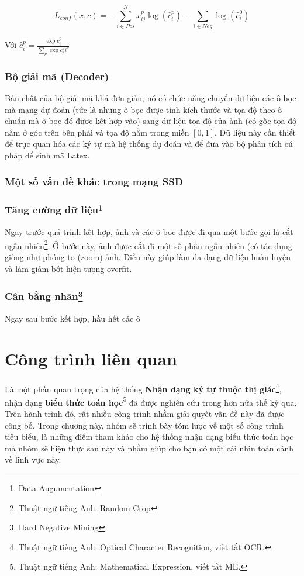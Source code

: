 \documentclass[a4paper,12pt]{article}
\begin{document}
	$$L_{conf}(x, c) = - \sum^N_{i \in Pos} x^p_{ij} \log (\hat{c}^p_i) - \sum_{i \in Neg} \log (\hat{c}^0_i) $$
	
	Với $\hat{c}_i^p = \frac{\exp{c_i^p}}{\sum_p \exp{c)i^p}}$
	
	\subsubsection{Bộ giải mã (Decoder)}
	
	Bản chất của bộ giải mã khá đơn giản, nó có chức năng chuyển dữ liệu các ô bọc mà mạng dự đoán (tức là những ô bọc được tính kích thước và tọa độ theo ô chuẩn mà ô bọc đó được kết hợp vào) sang dữ liệu tọa độ của ảnh (có gốc tọa độ nằm ở góc trên bên phải và tọa độ nằm trong miền $[0, 1]$. Dữ liệu này cần thiết để trực quan hóa các ký tự mà hệ thống dự đoán và để đưa vào bộ phân tích cú pháp để sinh mã Latex.
	
	\subsubsection{Một số vấn đề khác trong mạng SSD}
	\subsubsection*{Tăng cường dữ liệu\footnote{Data Augumentation}}
	
	Ngay trước quá trình kết hợp, ảnh và các ô bọc được đi qua một bước gọi là cắt ngẫu nhiên\footnote{Thuật ngữ tiếng Anh: Random Crop}. Ở bước này, ảnh được cắt đi một số phần ngẫu nhiên (có tác dụng giống như phóng to (zoom) ảnh. Điều này giúp làm đa dạng dữ liệu huấn luyện và làm giảm bớt hiện tượng overfit.
	
	\subsubsection*{Cân bằng nhãn\footnote{Hard Negative Mining}}	
	
	Ngay sau bước kết hợp, hầu hết các ô 
	
	
	
	\newpage
	\section{Công trình liên quan}
	Là một phần quan trọng của hệ thống \textbf{Nhận dạng ký tự thuộc thị giác}\footnote{Thuật ngữ tiếng Anh: Optical Character Recognition, viết tắt OCR.}, nhận dạng \textbf{biểu thức toán học}\footnote{Thuật ngữ tiếng Anh: Mathematical Expression, viết tắt ME.} đã được nghiên cứu trong hơn nửa thế kỷ qua. Trên hành trình đó, rất nhiều công trình nhằm giải quyết vấn đề này đã được công bố. Trong chương này, nhóm sẽ trình bày tóm lược về một số công trình tiêu biểu, là những điểm tham khảo cho hệ thống nhận dạng biểu thức toán học mà nhóm sẽ hiện thực sau này và nhằm giúp cho bạn có một cái nhìn toàn cảnh về lĩnh vực này.
\end{document}

